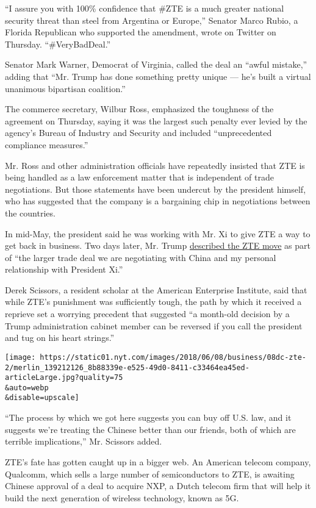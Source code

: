 ``I assure you with 100\% confidence that \#ZTE is a much greater
national security threat than steel from Argentina or Europe,'' Senator
Marco Rubio, a Florida Republican who supported the amendment, wrote on
Twitter on Thursday. ``\#VeryBadDeal.''

Senator Mark Warner, Democrat of Virginia, called the deal an ``awful
mistake,'' adding that ``Mr. Trump has done something pretty unique ---
he's built a virtual unanimous bipartisan coalition.''

The commerce secretary, Wilbur Ross, emphasized the toughness of the
agreement on Thursday, saying it was the largest such penalty ever
levied by the agency's Bureau of Industry and Security and included
``unprecedented compliance measures.''

Mr. Ross and other administration officials have repeatedly insisted
that ZTE is being handled as a law enforcement matter that is
independent of trade negotiations. But those statements have been
undercut by the president himself, who has suggested that the company is
a bargaining chip in negotiations between the countries.

In mid-May, the president said he was working with Mr. Xi to give ZTE a
way to get back in business. Two days later, Mr. Trump
\href{https://twitter.com/realDonaldTrump/status/996119678551552000}{described
the ZTE move} as part of ``the larger trade deal we are negotiating with
China and my personal relationship with President Xi.''

Derek Scissors, a resident scholar at the American Enterprise Institute,
said that while ZTE's punishment was sufficiently tough, the path by
which it received a reprieve set a worrying precedent that suggested ``a
month-old decision by a Trump administration cabinet member can be
reversed if you call the president and tug on his heart strings.''

\texttt{[image: https://static01.nyt.com/images/2018/06/08/business/08dc-zte-2/merlin\_139212126\_8b88339e-e525-49d0-8411-c33464ea45ed-articleLarge.jpg?quality=75\\\&auto=webp\\\&disable=upscale]}

``The process by which we got here suggests you can buy off U.S. law,
and it suggests we're treating the Chinese better than our friends, both
of which are terrible implications,'' Mr. Scissors added.

ZTE's fate has gotten caught up in a bigger web. An American telecom
company, Qualcomm, which sells a large number of semiconductors to ZTE,
is awaiting Chinese approval of a deal to acquire NXP, a Dutch telecom
firm that will help it build the next generation of wireless technology,
known as 5G.


